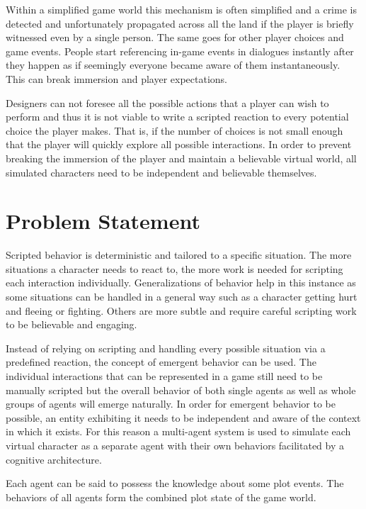 Within a simplified game world this mechanism is often simplified and a crime is detected and unfortunately propagated across all the land if the player is briefly witnessed even by a single person.
The same goes for other player choices and game events.
People start referencing in-game events in dialogues instantly after they happen as if seemingly everyone became aware of them instantaneously.
This can break immersion and player expectations.

Designers can not foresee all the possible actions that a player can wish to perform and thus it is not viable to write a scripted reaction to every potential choice the player makes.
That is, if the number of choices is not small enough that the player will quickly explore all possible interactions.
In order to prevent breaking the immersion of the player and maintain a believable virtual world, all simulated characters need to be independent and believable themselves.

\section*{Problem Statement}

Scripted behavior is deterministic and tailored to a specific situation.
The more situations a character needs to react to, the more work is needed for scripting each interaction individually.
Generalizations of behavior help in this instance as some situations can be handled in a general way such as a character getting hurt and fleeing or fighting.
Others are more subtle and require careful scripting work to be believable and engaging.

Instead of relying on scripting and handling every possible situation via a predefined reaction, the concept of emergent behavior can be used.
The individual interactions that can be represented in a game still need to be manually scripted but the overall behavior of both single agents as well as whole groups of agents will emerge naturally.
In order for emergent behavior to be possible, an entity exhibiting it needs to be independent and aware of the context in which it exists.
For this reason a multi-agent system is used to simulate each virtual character as a separate agent with their own behaviors facilitated by a cognitive architecture.

Each agent can be said to possess the knowledge about some plot events.
The behaviors of all agents form the combined plot state of the game world.

